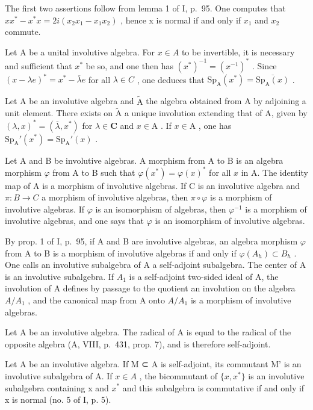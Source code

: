 The first two assertions follow from lemma 1 of I, p.~95. One computes that \(xx^{*} - x^{*}x = 2i(x_{2}x_{1} - x_{1}x_{2})\) , hence x is normal if and only if \(x_{1}\) and \(x_{2}\) commute.

Let A be a unital involutive algebra. For \(x \in A\) to be invertible, it is necessary and sufficient that \(x^{*}\) be so, and one then has \((x^{*})^{-1} = (x^{-1})^{*}\) . Since \((x - \lambda e)^{*} = x^{*} - \overline{\lambda}e\) for all \(\lambda \in C\) , one deduces that \(\mathrm{Sp}_{\mathrm{A}}(x^{*}) = \overline{\mathrm{Sp}_{\mathrm{A}}(x)}\) .

Let A be an involutive algebra and \(\widetilde{\mathrm{A}}\) the algebra obtained from A by adjoining a unit element. There exists on \(\widetilde{\mathrm{A}}\) a unique involution extending that of A, given by \((\lambda, x)^{*} = (\overline{\lambda}, x^{*})\) for \(\lambda \in \mathbf{C}\) and \(x \in \mathrm{A}\) . If \(x \in \mathrm{A}\) , one has \(\mathrm{Sp}_{\mathrm{A}}'(x^{*}) = \overline{\mathrm{Sp}_{\mathrm{A}}'(x)}\) .

Let A and B be involutive algebras. A morphism from A to B is an algebra morphism \(\varphi\) from A to B such that \(\varphi(x^{*}) = \varphi(x)^{*}\) for all \(x\) in A. The identity map of A is a morphism of involutive algebras. If C is an involutive algebra and \(\pi: B \to C\) a morphism of involutive algebras, then \(\pi \circ \varphi\) is a morphism of involutive algebras. If \(\varphi\) is an isomorphism of algebras, then \(\varphi^{-1}\) is a morphism of involutive algebras, and one says that \(\varphi\) is an isomorphism of involutive algebras.

By prop. 1 of I, p.~95, if A and B are involutive algebras, an algebra morphism \(\varphi\) from A to B is a morphism of involutive algebras if and only if \(\varphi(A_h) \subset B_h\) . One calls an involutive subalgebra of A a self-adjoint subalgebra. The center of A is an involutive subalgebra. If \(A_1\) is a self-adjoint two-sided ideal of A, the involution of A defines by passage to the quotient an involution on the algebra \(A/A_1\) , and the canonical map from A onto \(A/A_1\) is a morphism of involutive algebras.

Let A be an involutive algebra. The radical of A is equal to the radical of the opposite algebra (A, VIII, p.~431, prop. 7), and is therefore self-adjoint.

Let A be an involutive algebra. If M ⊂ A is self-adjoint, its commutant M' is an involutive subalgebra of A. If \(x \in A\) , the bicommutant of \(\{x, x^{*}\}\) is an involutive subalgebra containing x and \(x^{*}\) and this subalgebra is commutative if and only if x is normal (no. 5 of I, p. 5).

